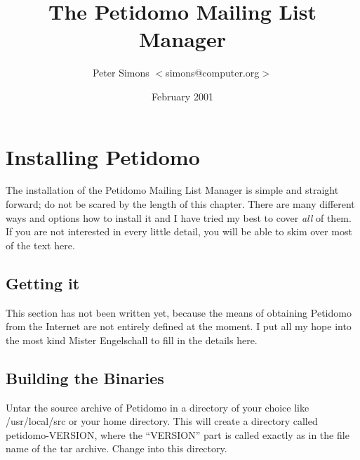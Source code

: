 \documentclass[a4paper,10pt]{scrreprt}
\begin{document}
\title{The Petidomo Mailing List Manager}
\author{Peter Simons $<$simons@computer.org$>$}
\date{February 2001}
\maketitle

\tableofcontents
\clearpage

\chapter{Installing Petidomo}

The installation of the Petidomo Mailing List Manager is simple and
straight forward; do not be scared by the length of this chapter.
There are many different ways and options how to install it and I have
tried my best to cover \emph{all} of them. If you are not interested
in every little detail, you will be able to skim over most of the text
here.

\section{Getting it}

    {\sf This section has not been written yet, because the means of
    obtaining Petidomo from the Internet are not entirely defined at
    the moment. I put all my hope into the most kind Mister
    Engelschall to fill in the details here. }

\section{Building the Binaries}

Untar the source archive of Petidomo in a directory of your choice
like {\sf /usr/local/src} or your home directory. This will create a
directory called {\sf petidomo-VERSION}, where the ``{\sf VERSION}''
part is called exactly as in the file name of the tar archive. Change
into this directory.
\end{document}
